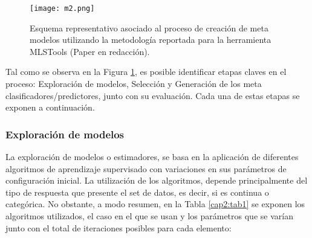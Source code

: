\begin{figure}[!h]
	\centering
	\texttt{[image: m2.png]}
	\caption{Esquema representativo asociado al proceso de creación de meta modelos utilizando la metodología reportada para la herramienta MLSTools (Paper en redacción).}
	\label{C2:M2}
\end{figure}

Tal como se observa en la Figura \ref{C2:M2}, es posible identificar etapas claves en el proceso: Exploración de modelos, Selección y Generación de los meta clasificadores/predictores, junto con su evaluación. Cada una de estas etapas se exponen a continuación.

\subsubsection{Exploración de modelos}

La exploración de modelos o estimadores, se basa en la aplicación de diferentes algoritmos de aprendizaje supervisado con variaciones en sus parámetros de configuración inicial. La utilización de los algoritmos, depende principalmente del tipo de respuesta que presente el set de datos, es decir, si es continua o categórica. No obstante, a modo resumen, en la Tabla \ref{cap2:tab1} se exponen los algoritmos utilizados, el caso en el que se usan y los parámetros que se varían junto con el total de iteraciones posibles para cada elemento:

